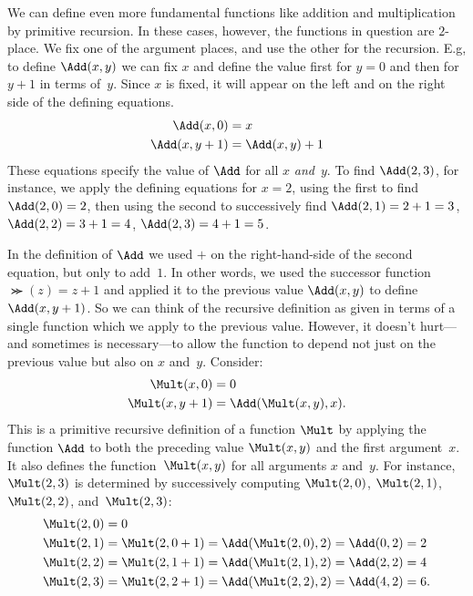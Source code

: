 \documentclass[../../../include/open-logic-section]{subfiles}
\begin{document}
We can define even more fundamental functions like addition and
multiplication by primitive recursion. In these cases, however, the
functions in question are $2$-place. We fix one of the argument
places, and use the other for the recursion. E.g, to define
$\Add(x, y)$ we can fix $x$ and define the value first for $y=0$
and then for $y+1$ in terms of~$y$. Since $x$ is fixed, it will appear
on the left and on the right side of the defining equations.
\begin{align*}
\Add(x,0) & =  x \\
\Add(x,y+1) & =  \Add(x,y)+1
\end{align*}
These equations specify the value of $\Add$ for all $x$
\emph{and}~$y$. To find $\Add(2,3)$, for instance, we apply the
defining equations for $x = 2$, using the first to find
$\Add(2,0) = 2$, then using the second to successively find
$\Add(2,1) = 2 + 1 = 3$, $\Add(2, 2) = 3 + 1 = 4$, $\Add(2,
3) = 4 + 1 = 5$.

In the definition of $\Add$ we used $+$ on the right-hand-side of
the second equation, but only to add~$1$. In other words, we used the
successor function $\Succ(z) = z+1$ and applied it to the previous value
$\Add(x,y)$ to define $\Add(x,y+1)$. So we can think of the
recursive definition as given in terms of a single function which we
apply to the previous value. However, it doesn't hurt---and sometimes
is necessary---to allow the function to depend not just on the previous
value but also on $x$ and~$y$. Consider:
\begin{align*}
  \Mult(x,0) & =  0 \\
  \Mult(x,y+1) & =  \Add(\Mult(x,y),x).
\end{align*}
This is a primitive recursive definition of a function $\Mult$ by
applying the function $\Add$ to both the preceding value
$\Mult(x,y)$ and the first argument~$x$. It also defines the
function~$\Mult(x,y)$ for all arguments $x$ and~$y$. For instance,
$\Mult(2,3)$ is determined by successively computing $\Mult(2,0)$,
$\Mult(2,1)$, $\Mult(2,2)$, and~$\Mult(2,3)$:
\begin{align*}
  \Mult(2,0) & = 0\\
  \Mult(2,1) & = \Mult(2,0+1) =
  \Add(\Mult(2,0), 2) = \Add(0, 2) = 2\\
  \Mult(2,2) & = \Mult(2,1+1) =
  \Add(\Mult(2,1), 2) = \Add(2, 2) = 4\\
  \Mult(2,3) & = \Mult(2,2+1) =
  \Add(\Mult(2,2), 2) = \Add(4, 2) = 6.
\end{align*}
\end{document}
